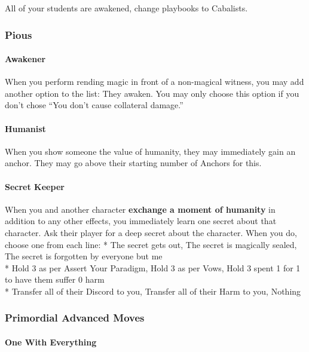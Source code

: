 \documentclass[
  oneside,
  statementpaper,
  9pt]{memoir}
\begin{document}
All of your students are awakened, change playbooks to Cabalists.

\hypertarget{pious}{%
\subsubsection{Pious}\label{pious}}

\hypertarget{awakener}{%
\paragraph{Awakener}\label{awakener}}

When you perform rending magic in front of a non-magical witness, you
may add another option to the list: They awaken. You may only choose
this option if you don't chose ``You don't cause collateral damage.''

\hypertarget{humanist}{%
\paragraph{Humanist}\label{humanist}}

When you show someone the value of humanity, they may immediately gain
an anchor. They may go above their starting number of Anchors for this.

\hypertarget{secret-keeper}{%
\paragraph{Secret Keeper}\label{secret-keeper}}

When you and another character \textbf{exchange a moment of humanity} in
addition to any other effects, you immediately learn one secret about
that character. Ask their player for a deep secret about the character.
When you do, choose one from each line: * The secret gets out, The
secret is magically sealed, The secret is forgotten by everyone but me\\
* Hold 3 as per Assert Your Paradigm, Hold 3 as per Vows, Hold 3 spent 1
for 1 to have them suffer 0 harm\\
* Transfer all of their Discord to you, Transfer all of their Harm to
you, Nothing

\hypertarget{primordial-advanced-moves}{%
\subsubsection{Primordial Advanced
Moves}\label{primordial-advanced-moves}}

\hypertarget{one-with-everything}{%
\paragraph{One With Everything}\label{one-with-everything}}
\end{document}
